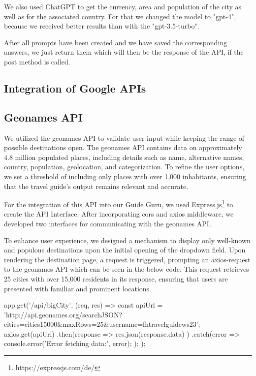 \documentclass[english,notitlepage,smartquotes]{hgbreport}
\begin{document}
We also used ChatGPT to get the currency, area and population of the city as well as for the associated country. For that we changed the model to "gpt-4", because we received better results than with the "gpt-3.5-turbo".

After all prompts have been created and we have saved the corresponding answers, we just return them which will then be the response of the API, if the post method is called.

\subsection{Integration of Google APIs}

\subsection{Geonames API} \label{GeonamesAPI}
We utilized the geonames API to validate user input while keeping the range of possible destinations open. The geonames API contains data on approximately 4.8 million populated places, including details such as name, alternative names, country, population, geolocation, and categorization. To refine the user options, we set a threshold of including only places with over 1,000 inhabitants, ensuring that the travel guide's output remains relevant and accurate.

For the integration of this API into our Guide Guru, we used Express.js\footnote{https://expressjs.com/de/} to create the API Interface. After incorporating cors and axios middleware, we developed two interfaces for communicating with the geonames API.

To enhance user experience, we designed a mechanism to display only well-known and populous destinations upon the initial opening of the dropdown field. Upon rendering the destination page, a request is triggered, prompting an axios-request to the geonames API which can be seen in the below code. This request retrieves 25 cities with over 15,000 residents in its response, ensuring that users are presented with familiar and prominent locations.

\begin{JsCode}
app.get('/api/bigCity', (req, res) => {
	const apiUrl = 'http://api.geonames.org/searchJSON?cities=cities15000&maxRows=25&username=fhtravelguidews23';
	axios.get(apiUrl)
	.then(response => {
		res.json(response.data)
	})
	.catch(error => {
		console.error('Error fetching data:', error);
	});
});
\end{JsCode}
\end{document}
